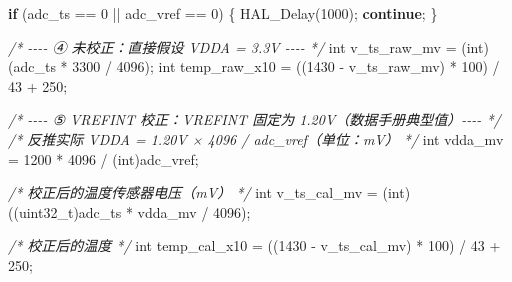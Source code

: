 \documentclass[
  chinese,
  UTF8,
  oneside,
  openany]{ctexbook}
\newenvironment{Shaded}{}{}
\newcommand{\CommentTok}[1]{\textcolor[rgb]{0.38,0.63,0.69}{\textit{#1}}}
\newcommand{\ControlFlowTok}[1]{\textcolor[rgb]{0.00,0.44,0.13}{\textbf{#1}}}
\newcommand{\DataTypeTok}[1]{\textcolor[rgb]{0.56,0.13,0.00}{#1}}
\newcommand{\DecValTok}[1]{\textcolor[rgb]{0.25,0.63,0.44}{#1}}
\newcommand{\NormalTok}[1]{#1}
\newcommand{\OperatorTok}[1]{\textcolor[rgb]{0.40,0.40,0.40}{#1}}
\begin{document}
\begin{Shaded}
\begin{Highlighting}[]
    \ControlFlowTok{if} \OperatorTok{(}\NormalTok{adc\_ts }\OperatorTok{==} \DecValTok{0} \OperatorTok{||}\NormalTok{ adc\_vref }\OperatorTok{==} \DecValTok{0}\OperatorTok{)}
    \OperatorTok{\{}
\NormalTok{        HAL\_Delay}\OperatorTok{(}\DecValTok{1000}\OperatorTok{);}
        \ControlFlowTok{continue}\OperatorTok{;}
    \OperatorTok{\}}

    \CommentTok{/* {-}{-}{-}{-} ④ 未校正：直接假设 VDDA = 3.3V {-}{-}{-}{-} */}
    \DataTypeTok{int}\NormalTok{ v\_ts\_raw\_mv }\OperatorTok{=} \OperatorTok{(}\DataTypeTok{int}\OperatorTok{)(}\NormalTok{adc\_ts }\OperatorTok{*} \DecValTok{3300} \OperatorTok{/} \DecValTok{4096}\OperatorTok{);}
    \DataTypeTok{int}\NormalTok{ temp\_raw\_x10 }\OperatorTok{=} \OperatorTok{((}\DecValTok{1430} \OperatorTok{{-}}\NormalTok{ v\_ts\_raw\_mv}\OperatorTok{)} \OperatorTok{*} \DecValTok{100}\OperatorTok{)} \OperatorTok{/} \DecValTok{43} \OperatorTok{+} \DecValTok{250}\OperatorTok{;}

    \CommentTok{/* {-}{-}{-}{-} ⑤ VREFINT 校正：VREFINT 固定为 1.20V（数据手册典型值）{-}{-}{-}{-} */}
    \CommentTok{/* 反推实际 VDDA = 1.20V × 4096 / adc\_vref（单位：mV） */}
    \DataTypeTok{int}\NormalTok{ vdda\_mv }\OperatorTok{=} \DecValTok{1200} \OperatorTok{*} \DecValTok{4096} \OperatorTok{/} \OperatorTok{(}\DataTypeTok{int}\OperatorTok{)}\NormalTok{adc\_vref}\OperatorTok{;}

    \CommentTok{/* 校正后的温度传感器电压（mV） */}
    \DataTypeTok{int}\NormalTok{ v\_ts\_cal\_mv }\OperatorTok{=} \OperatorTok{(}\DataTypeTok{int}\OperatorTok{)((}\DataTypeTok{uint32\_t}\OperatorTok{)}\NormalTok{adc\_ts }\OperatorTok{*}\NormalTok{ vdda\_mv }\OperatorTok{/} \DecValTok{4096}\OperatorTok{);}

    \CommentTok{/* 校正后的温度 */}
    \DataTypeTok{int}\NormalTok{ temp\_cal\_x10 }\OperatorTok{=} \OperatorTok{((}\DecValTok{1430} \OperatorTok{{-}}\NormalTok{ v\_ts\_cal\_mv}\OperatorTok{)} \OperatorTok{*} \DecValTok{100}\OperatorTok{)} \OperatorTok{/} \DecValTok{43} \OperatorTok{+} \DecValTok{250}\OperatorTok{;}


\end{Highlighting}
\end{Shaded}
\end{document}
